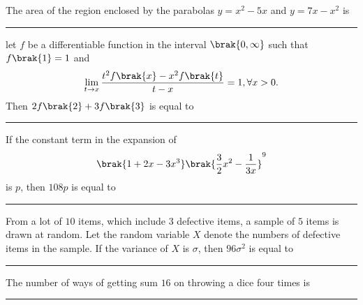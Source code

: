     \hfill{}
    
    \item 
    The area of the  region enclosed by the parabolas $y = x^2 - 5x$ and $y = 7x - x^2$ is \rule{1cm}{0.1pt}

    \hfill{}

    \item 
    let $f$ be a differentiable function in the interval $\brak{0, \infty}$ such that $f\brak{1} = 1$ and 
    \begin{align*}
        \lim_{t \to x} \frac{t^2f\brak{x} - x^2f\brak{t}}{t - x} = 1, \forall x > 0.
    \end{align*}
    Then $2f\brak{2} + 3f\brak{3}$ is equal to \rule{1cm}{0.1pt}

    \hfill{}

    \item 
    If the constant term in the expansion of 
    \begin{align*}
        \brak{1 + 2x - 3x^3}\brak{\frac{3}{2}x^2 - \frac{1}{3x}}^9 
    \end{align*}
    is $p$, then $108p$ is equal to \rule{1cm}{0.1pt}

    \hfill{}

    \item 
    From a lot of $10$ items, which include $3$ defective items, a sample of $5$ items is drawn at random. Let the random variable $X$ denote the numbers of defective items in the sample. If the variance of $X$ is $\sigma$, then $96\sigma^2$ is equal to \rule{1cm}{0.1pt}

    \hfill{}

    \item 
    The number of ways of getting sum $16$ on throwing a dice four times is \rule{1cm}{0.1pt}

    \hfill{}

%
